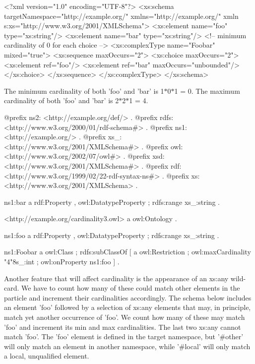 \begin{DoxyCodeInclude}
<?xml version="1.0" encoding="UTF-8"?>
<xs:schema targetNamespace="http://example.org/" xmlns="http://example.org/" xmln
      s:xs="http://www.w3.org/2001/XMLSchema">
        <xs:element name="foo" type="xs:string"/>
        <xs:element name="bar" type="xs:string"/>
        <!-- minimum cardinality of 0 for each choice -->
        <xs:complexType name="Foobar" mixed="true">
                <xs:sequence maxOccurs="2">
                        <xs:choice maxOccurs="2">
                                <xs:element ref="foo"/>
                                <xs:element ref="bar" maxOccurs="unbounded"/>
                        </xs:choice>
                </xs:sequence>
        </xs:complexType>
</xs:schema>
\end{DoxyCodeInclude}


The minimum cardinality of both 'foo' and 'bar' is 1$\ast$0$\ast$1 = 0. The maximum cardinality of both 'foo' and 'bar' is 2$\ast$2$\ast$1 = 4.


\begin{DoxyCodeInclude}
@prefix ns2:     <http://example.org/def/> .
@prefix rdfs:    <http://www.w3.org/2000/01/rdf-schema#> .
@prefix ns1:     <http://example.org/> .
@prefix xs_:     <http://www.w3.org/2001/XMLSchema#> .
@prefix owl:     <http://www.w3.org/2002/07/owl#> .
@prefix xsd:     <http://www.w3.org/2001/XMLSchema#> .
@prefix rdf:     <http://www.w3.org/1999/02/22-rdf-syntax-ns#> .
@prefix xs:      <http://www.w3.org/2001/XMLSchema> .

ns1:bar
      a       rdf:Property , owl:DatatypeProperty ;
      rdfs:range xs_:string .

<http://example.org/cardinality3.owl>
      a       owl:Ontology .

ns1:foo
      a       rdf:Property , owl:DatatypeProperty ;
      rdfs:range xs_:string .

ns1:Foobar
      a       owl:Class ;
      rdfs:subClassOf
              [ a       owl:Restriction ;
                owl:maxCardinality "4"^^xs_:int ;
                owl:onProperty ns1:foo
              ] .
\end{DoxyCodeInclude}


Another feature that will affect cardinality is the appearance of an xs:any wild-\/card. We have to count how many of these could match other elements in the particle and increment their cardinalities accordingly. The schema below includes an element 'foo' followed by a selection of xs:any elements that may, in principle, match yet another occurrence of 'foo'. We count how many of these may match 'foo' and increment its min and max cardinalities. The last two xs:any cannot match 'foo'. The 'foo' element is defined in the target namespace, but '\#other' will only match an element in another namespace, while '\#local' will only match a local, unqualified element.


